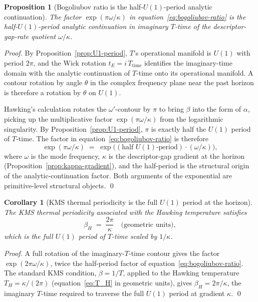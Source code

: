 \documentclass[11pt,a4paper]{article}
\newtheorem{corollary}[theorem]{Corollary}
\newtheorem{proposition}[theorem]{Proposition}
\theoremstyle{definition}
\theoremstyle{remark}
\begin{document}
\begin{proposition}[Bogoliubov ratio is the half-$U(1)$-period analytic continuation]\label{prop:bogoliubov-half-U1}
The factor $\exp(\pi\omega/\kappa)$ in equation~\eqref{eq:bogoliubov-ratio} is the half-$U(1)$-period analytic continuation in imaginary $T$-time of the descriptor-gap-rate quotient $\omega/\kappa$.
\end{proposition}

\begin{proof}
By Proposition~\ref{prop:U1-period}, $T$'s operational manifold is $U(1)$ with period $2\pi$, and the Wick rotation $t_{E} = i\,T_{\text{time}}$ identifies the imaginary-time domain with the analytic continuation of $T$-time onto its operational manifold. A contour rotation by angle $\theta$ in the complex frequency plane near the past horizon is therefore a rotation by $\theta$ on $U(1)$.

Hawking's calculation rotates the $\omega'$-contour by $\pi$ to bring $\beta$ into the form of $\alpha$, picking up the multiplicative factor $\exp(\pi\omega/\kappa)$ from the logarithmic singularity. By Proposition~\ref{prop:U1-period}, $\pi$ is exactly half the $U(1)$ period of $T$-time. The factor in equation~\eqref{eq:bogoliubov-ratio} is therefore
\[
\exp(\pi\omega/\kappa) \;=\; \exp\bigl((\text{half $U(1)$-period}) \cdot (\omega/\kappa)\bigr),
\]
where $\omega$ is the mode frequency, $\kappa$ is the descriptor-gap gradient at the horizon (Proposition~\ref{prop:kappa-gradient}), and the half-period is the structural origin of the analytic-continuation factor. Both arguments of the exponential are primitive-level structural objects. \qed
\end{proof}

\begin{corollary}[KMS thermal periodicity is the full $U(1)$ period at the horizon]\label{cor:KMS-period}
The KMS thermal periodicity associated with the Hawking temperature satisfies
\[
\beta_{H} \;=\; \frac{2\pi}{\kappa} \quad\text{(geometric units)},
\]
which is the full $U(1)$ period of $T$-time scaled by $1/\kappa$.
\end{corollary}

\begin{proof}
A full rotation of the imaginary-$T$-time contour gives the factor $\exp(2\pi\omega/\kappa)$, twice the half-period factor of equation~\eqref{eq:bogoliubov-ratio}. The standard KMS condition, $\beta = 1/T$, applied to the Hawking temperature $T_{H}=\kappa/(2\pi)$ (equation~\eqref{eq:T_H} in geometric units), gives $\beta_{H}=2\pi/\kappa$, the imaginary $T$-time required to traverse the full $U(1)$ period at gradient $\kappa$. \qed
\end{proof}
\end{document}
